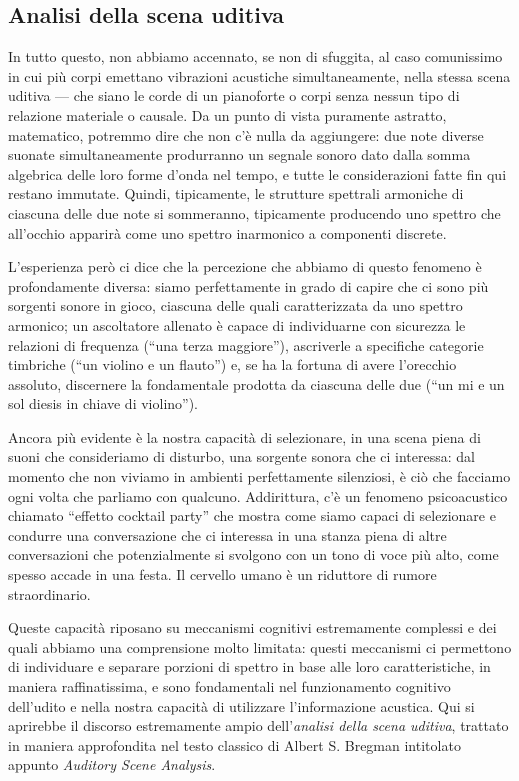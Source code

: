 \subsection{Analisi della scena uditiva}

In tutto questo, non abbiamo accennato, se non di sfuggita, al caso comunissimo in cui più corpi emettano vibrazioni acustiche simultaneamente, nella stessa scena uditiva --- che siano le corde di un pianoforte o corpi senza nessun tipo di relazione materiale o causale. Da un punto di vista puramente astratto, matematico, potremmo dire che non c'è nulla da aggiungere: due note diverse suonate simultaneamente produrranno un segnale sonoro dato dalla somma algebrica delle loro forme d'onda nel tempo, e tutte le considerazioni fatte fin qui restano immutate. Quindi, tipicamente, le strutture spettrali armoniche di ciascuna delle due note si sommeranno, tipicamente producendo uno spettro che all'occhio apparirà come uno spettro inarmonico a componenti discrete.

L'esperienza però ci dice che la percezione che abbiamo di questo fenomeno è profondamente diversa: siamo perfettamente in grado di capire che ci sono più sorgenti sonore in gioco, ciascuna delle quali caratterizzata da uno spettro armonico; un ascoltatore allenato è capace di individuarne con sicurezza le relazioni di frequenza (``una terza maggiore''), ascriverle a specifiche categorie timbriche (``un violino e un flauto'') e, se ha la fortuna di avere l'orecchio assoluto, discernere la fondamentale prodotta da ciascuna delle due (``un mi e un sol diesis in chiave di violino''). 

Ancora più evidente è la nostra capacità di selezionare, in una scena piena di suoni che consideriamo di disturbo, una  sorgente sonora che ci interessa: dal momento che non viviamo in ambienti perfettamente silenziosi, è ciò che facciamo ogni volta che parliamo con qualcuno. Addirittura, c'è un fenomeno psicoacustico chiamato ``effetto cocktail party'' che mostra come siamo capaci di selezionare e condurre una conversazione che ci interessa in una stanza piena di altre conversazioni che potenzialmente si svolgono con un tono di voce più alto, come spesso accade in una festa. Il cervello umano è un riduttore di rumore straordinario.

Queste capacità riposano su meccanismi cognitivi estremamente complessi e dei quali abbiamo una comprensione molto limitata: questi meccanismi ci permettono di individuare e separare porzioni di spettro in base alle loro caratteristiche, in maniera raffinatissima, e sono fondamentali nel funzionamento cognitivo dell'udito e nella nostra capacità di utilizzare l'informazione acustica. Qui si aprirebbe il discorso estremamente ampio dell'\emph{analisi della scena uditiva}, trattato in maniera approfondita nel testo classico di Albert S. Bregman intitolato appunto \emph{Auditory Scene Analysis}.





